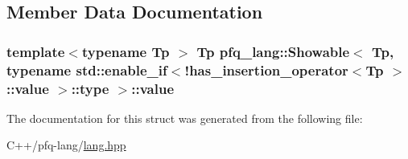 \subsection{Member Data Documentation}
\hypertarget{structpfq__lang_1_1Showable_3_01Tp_00_01typename_01std_1_1enable__if_3_9has__insertion__operator488b85264b5317ebf7312bb7e4c18409_af61a159a00530105e659ad818acdd9ec}{
\subsubsection[{value}]{\setlength{\rightskip}{0pt plus 5cm}template$<$typename Tp $>$ Tp {\bf pfq\+\_\+lang\+::\+Showable}$<$ Tp, typename std\+::enable\+\_\+if$<$!{\bf has\+\_\+insertion\+\_\+operator}$<$Tp $>$\+::value $>$\+::type $>$\+::value}}\label{structpfq__lang_1_1Showable_3_01Tp_00_01typename_01std_1_1enable__if_3_9has__insertion__operator488b85264b5317ebf7312bb7e4c18409_af61a159a00530105e659ad818acdd9ec}


The documentation for this struct was generated from the following file\+:\begin{DoxyCompactItemize}
\item 
C++/pfq-\/lang/\hyperlink{lang_8hpp}{lang.\+hpp}\end{DoxyCompactItemize}

